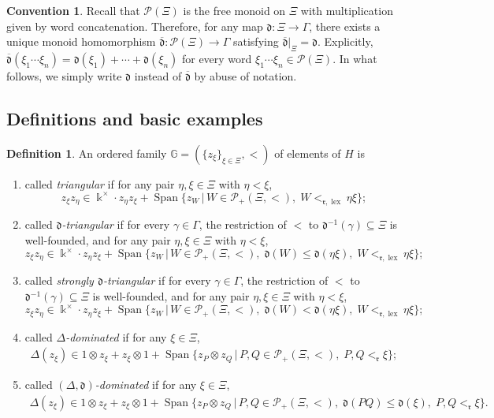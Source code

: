 \documentclass{article}
\theoremstyle{plain}
\theoremstyle{definition}
\newtheorem{definition}[thm]{Definition}
\newtheorem{convention}[thm]{Convention}
\numberwithin{equation}{section}
\DeclareMathOperator{\Span}{Span}
\DeclareMathOperator{\lex}{lex}
\newcommand{\PP}{\mathcal{P}}
\newcommand{\GG}{\mathbb{G}}
\newcommand{\dd}{\mathfrak{d}}
\newcommand{\rr}{\mathfrak{r}}
\begin{document}
	\begin{convention}
		Recall that $\PP(\Xi)$ is the free monoid on $\Xi$ with multiplication given by word concatenation. Therefore, for any map $\dd\colon \Xi \to \Gamma$, there exists a unique monoid homomorphism $\overline{\dd}\colon \PP(\Xi) \to \Gamma$ satisfying $\overline{\dd}|_{\Xi}=\dd$. Explicitly,
		$\overline{\dd}(\xi_{1}\cdots\xi_{n})=\dd(\xi_{1})+\cdots+\dd(\xi_{n})$
		for every word $\xi_{1}\cdots \xi_{n}\in \PP(\Xi)$. In what follows, we simply write $\dd$ instead of $\overline{\dd}$ by abuse of notation.
	\end{convention}
	
	\subsection{Definitions and basic examples}
	
	\begin{definition}\label{definition-triangular}
		An ordered family $\GG=(\{z_{\xi}\}_{\xi\in \Xi}, <)$ of elements of $H$ is
		\begin{enumerate}
			\item called \emph{triangular} if for any pair $\eta,\xi \in \Xi$ with $\eta < \xi$,
			\[
			z_\xi z_\eta \in \Bbbk^{\times} \cdot z_\eta z_\xi + \Span\big\{z_{W} \,\big|\, W \in \PP_{+}(\Xi, <),\; W<_{\rr,\lex} \eta\xi \big\};
			\]
			\item called \emph{$\dd$-triangular} if for every $\gamma\in \Gamma$, the restriction of $<$ to $\dd^{-1}(\gamma) \subseteq \Xi$ is well-founded, and for any pair $\eta,\xi \in \Xi$ with $\eta < \xi$,
			\[
			z_\xi z_\eta \in  \Bbbk^{\times} \cdot z_\eta z_\xi + \Span\big\{z_{W} \,\big|\, W \in \PP_{+}(\Xi, <),\; \dd(W) \leq \dd(\eta\xi),\; W<_{\rr,\lex} \eta\xi \big\};
			\]
			\item called \emph{strongly $\dd$-triangular} if for every $\gamma\in \Gamma$, the restriction of $<$ to $\dd^{-1}(\gamma) \subseteq \Xi$ is well-founded, and for any pair $\eta,\xi \in \Xi$ with $\eta < \xi$,
			\[
			z_\xi z_\eta \in  \Bbbk^{\times} \cdot z_\eta z_\xi + \Span\big\{z_{W} \,\big|\, W \in \PP_{+}(\Xi, <),\; \dd(W) < \dd(\eta\xi),\; W<_{\rr,\lex} \eta\xi \big\};
			\]
			\item called \emph{$\Delta$-dominated} if for any $\xi\in \Xi$,
			\begin{eqnarray*}
				\Delta(z_\xi) \in 1 \otimes z_\xi+z_\xi \otimes 1  + \Span \big \{z_{P}\otimes z_{Q} \,\big|\, P,Q\in \PP_{+}(\Xi, <),\; P,Q <_{\rr} \xi \big\};
			\end{eqnarray*}
			\item called \emph{$(\Delta,\dd)$-dominated} if for any $\xi\in \Xi$,
			\begin{eqnarray*}
				\Delta(z_\xi) \in 1 \otimes z_\xi+z_\xi \otimes 1  + \Span \big \{z_{P}\otimes z_{Q} \,\big|\, P,Q\in \PP_{+}(\Xi, <),\; \dd(PQ) \leq \dd(\xi),\; P, Q <_{\rr} \xi \big\}.
			\end{eqnarray*}
		\end{enumerate}
	\end{definition}
	
\end{document}
